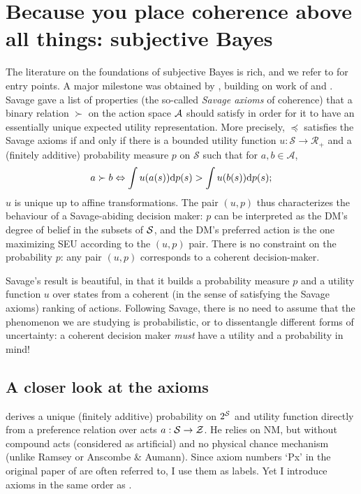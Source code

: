 \section{Because you place coherence above all things: subjective Bayes}
The literature on the foundations of subjective Bayes is rich, and we refer to \citep{PaIn09} for entry points. 
A major milestone was obtained by \cite{Sav53}, building on work of \cite{VoMo} and \cite{Ram}. 
Savage gave a list of properties (the so-called \emph{Savage axioms} of coherence) that a binary relation $\succ$ on the action space $\mathcal{A}$ should satisfy in order for it to have an essentially unique expected utility representation.
More precisely, $\preccurlyeq$ satisfies the Savage axioms if and only if there is a bounded utility function $u:\mathcal{S}\rightarrow\mathcal{R}_+$ and a (finitely additive) probability measure $p$ on $\mathcal{S}$ such that for $a, b\in \mathcal{A}$, 
$$
a \succ b \Leftrightarrow \int u(a(s))\mathrm{d} p(s) > \int u(b(s))\mathrm{d} p(s);
$$
$u$ is unique up to affine transformations. 
The pair $(u,p)$ thus characterizes the behaviour of a Savage-abiding decision maker: $p$ can be interpreted as the DM's degree of belief in the subsets of $\mathcal{S}$, and the DM's preferred action is the one maximizing SEU according to the $(u,p)$ pair.
There is no constraint on the probability $p$: any pair $(u,p)$ corresponds to a coherent decision-maker. 

Savage's result is beautiful, in that it builds a probability measure $p$ and a utility function $u$ over states from a coherent (in the sense of satisfying the Savage axioms) ranking of actions.
Following Savage, there is no need to assume that the phenomenon we are studying is probabilistic, or to dissentangle different forms of uncertainty: a coherent decision maker \emph{must} have a utility and a probability in mind!

\subsection{A closer look at the axioms}
\cite{Sav54} derives a unique (finitely additive) probability on $2^{\mathcal{S}}$ and utility function directly from a preference relation over acts $a:\mathcal{S}\rightarrow\mathcal{Z}$. He relies on NM, but without compound acts (considered as artificial) and no physical chance mechanism (unlike Ramsey or Anscombe \& Aumann). Since axiom numbers `Px' in the original paper of \cite{Sav54} are often referred to, I use them as labels. Yet I introduce axioms in the same order as \cite{PaIn09}.

